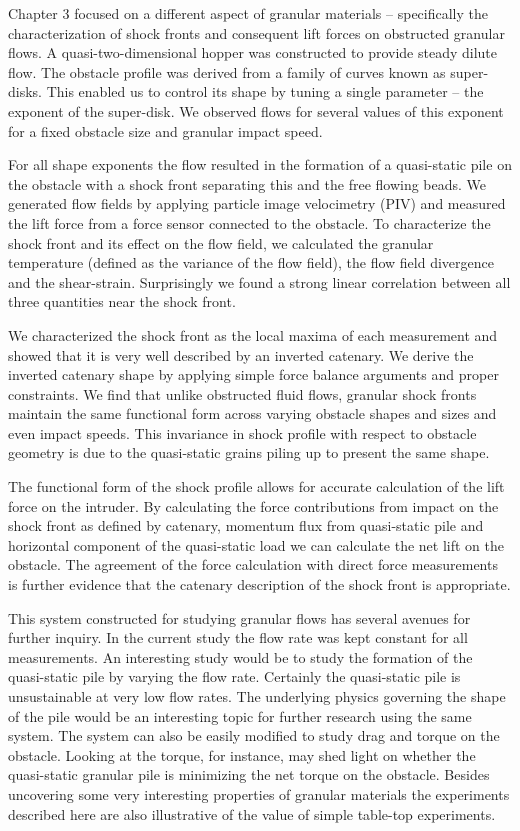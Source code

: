Chapter 3 focused on a different aspect of granular materials – specifically the characterization of shock fronts and consequent lift forces on obstructed granular flows. A quasi-two-dimensional hopper was constructed to provide steady dilute flow. The obstacle profile was derived from a family of curves known as super-disks. This enabled us to control its shape by tuning a single parameter – the exponent of the super-disk. We observed flows for several values of this exponent for a fixed obstacle size and granular impact speed. 

For all shape exponents the flow resulted in the formation of a quasi-static pile on the obstacle with a shock front separating this and the free flowing beads. We generated flow fields by applying particle image velocimetry (PIV) and measured the lift force from a force sensor connected to the obstacle. To characterize the shock front and its effect on the flow field, we calculated the granular temperature (defined as the variance of the flow field), the flow field divergence and the shear-strain. Surprisingly we found a strong linear correlation between all three quantities near the shock front. 

We characterized the shock front as the local maxima of each measurement and showed that it is very well described by an inverted catenary. We derive the inverted catenary shape by applying simple force balance arguments and proper constraints. We find that unlike obstructed fluid flows, granular shock fronts maintain the same functional form across varying obstacle shapes and sizes and even impact speeds. This invariance in shock profile with respect to obstacle geometry is due to the quasi-static grains piling up to present the same shape. 

The functional form of the shock profile allows for accurate calculation of the lift force on the intruder. By calculating the force contributions from impact on the shock front as defined by catenary, momentum flux from quasi-static pile and horizontal component of the quasi-static load we can calculate the net lift on the obstacle. The agreement of the force calculation with direct force measurements is further evidence that the catenary description of the shock front is appropriate. 

This system constructed for studying granular flows has several avenues for further inquiry. In the current study the flow rate was kept constant for all measurements. An interesting study would be to study the formation of the quasi-static pile by varying the flow rate. Certainly the quasi-static pile is unsustainable at very low flow rates. The underlying physics governing the shape of the pile would be an interesting topic for further research using the same system. The system can also be easily modified to study drag and torque on the obstacle. Looking at the torque, for instance, may shed light on whether the quasi-static granular pile is minimizing the net torque on the obstacle.
Besides uncovering some very interesting properties of granular materials the experiments described here are also illustrative of the value of simple table-top experiments.             
